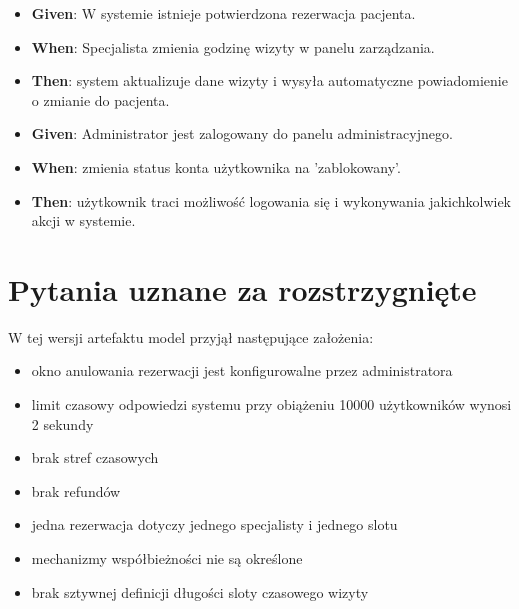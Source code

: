 \documentclass[12pt,a4paper]{article}
\begin{document}
\begin{description}[leftmargin=1.5cm, labelwidth=1cm, labelsep=0.5cm]
\item[\textbf{AC5 -- }] 
\begin{itemize}[itemsep=2pt]
    \item \textbf{Given}: W systemie istnieje potwierdzona rezerwacja pacjenta.
    \item \textbf{When}: Specjalista zmienia godzinę wizyty w panelu zarządzania. 
    \item \textbf{Then}: system aktualizuje dane wizyty i wysyła automatyczne powiadomienie o zmianie do pacjenta.
\end{itemize}

\item[\textbf{AC6 -- }] 
\begin{itemize}[itemsep=2pt]
    \item \textbf{Given}: Administrator jest zalogowany do panelu administracyjnego.
    \item \textbf{When}: zmienia status konta użytkownika na 'zablokowany'.
    \item \textbf{Then}: użytkownik traci możliwość logowania się i wykonywania jakichkolwiek akcji w systemie.
\end{itemize}

\vspace{0.5cm}

\end{description}


\section{Pytania uznane za rozstrzygnięte}

W tej wersji artefaktu model przyjął następujące założenia:

\begin{itemize}[leftmargin=1.5em]
  \item okno anulowania rezerwacji jest konfigurowalne przez administratora
  \item limit czasowy odpowiedzi systemu przy obiążeniu 10000 użytkowników wynosi 2 sekundy 
  \item brak stref czasowych
    \item brak refundów
    \item jedna rezerwacja dotyczy jednego specjalisty i jednego slotu
    \item mechanizmy współbieżności nie są określone
    \item brak sztywnej definicji długości sloty czasowego wizyty
\end{itemize}
\end{document}

